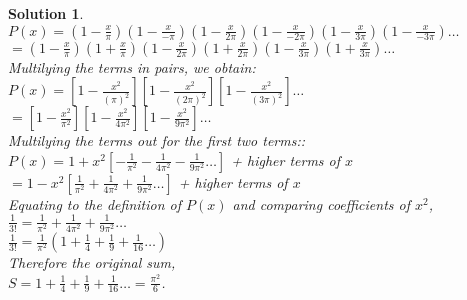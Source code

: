 \documentclass{article}
\newtheorem*{solution*}{Solution}
\begin{document}
\begin{solution*}
    $P(x) = (1-\frac{x}{\pi})(1-\frac{x}{-\pi})
    (1-\frac{x}{2\pi})(1-\frac{x}{-2\pi})
    (1-\frac{x}{3\pi})(1-\frac{x}{-3\pi})\dots$\\

    $= (1-\frac{x}{\pi})(1+\frac{x}{\pi})
    (1-\frac{x}{2\pi})(1+\frac{x}{2\pi})
    (1-\frac{x}{3\pi})(1+\frac{x}{3\pi})\dots$\\

    Multilying the terms in pairs, we obtain:\\
    
    $P(x) = [1-\frac{x^2}{(\pi)^2}]
    [1-\frac{x^2}{(2\pi)^2}]
    [1-\frac{x^2}{(3\pi)^2}]\dots$\\
    
    $= [1-\frac{x^2}{\pi^2}]
    [1-\frac{x^2}{4\pi^2}]
    [1-\frac{x^2}{9\pi^2}]\dots$\\

    Multilying the terms out for the first two terms::\\
    
    $P(x) = 1 + x^2 [
        -\frac{1}{\pi^2}
        -\frac{1}{4\pi^2}
        -\frac{1}{9\pi^2}\dots]
    $ + higher terms of $x$\\
    
    $= 1 - x^2 [
        \frac{1}{\pi^2}
        +\frac{1}{4\pi^2}
        +\frac{1}{9\pi^2}\dots]
    $ + higher terms of $x$\\
    
    Equating to the definition of $P(x)$ 
    and comparing coefficients of $x^2$,\\

    $\frac{1}{3!} = 
        \frac{1}{\pi^2}
        +\frac{1}{4\pi^2}
        +\frac{1}{9\pi^2}\dots$\\
        
    $\frac{1}{3!} = 
        \frac{1}{\pi^2}(1
        +\frac{1}{4}
        +\frac{1}{9}
        +\frac{1}{16}\dots
        )$\\
    
    Therefore the original sum,\\

    $S=1
    +\frac{1}{4}
    +\frac{1}{9}
    +\frac{1}{16}\dots
    =\frac{\pi^2}{6}$.
\end{solution*}
\end{document}
